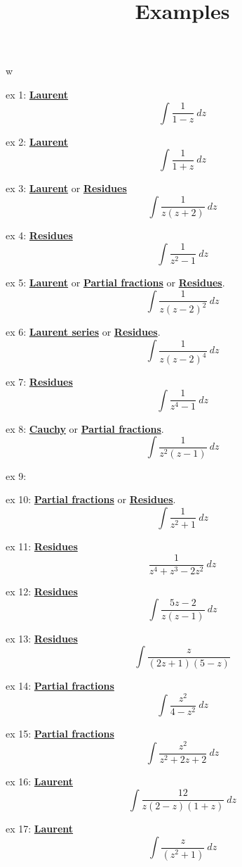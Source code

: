 w\documentclass[11pt, oneside]{article}
\title{Examples}
\date{}
\begin{document}
\maketitle
\large


ex 1:  \hyperref[sec:series_cheatsheet]{\textbf{Laurent}}
\[ \int \frac{1}{1 - z} \ dz \]

ex 2:  \hyperref[sec:series_cheatsheet]{\textbf{Laurent}}
\[ \int \frac{1}{1 + z} \ dz \]

ex 3:    \hyperref[sec:ex3L]{\textbf{Laurent}} or \hyperref[sec:ex3R]{\textbf{Residues}}
\[ \int \frac{1}{z(z + 2)} \ dz \]

ex 4:  \hyperref[sec:ex4R]{\textbf{Residues}} 
\[ \int \frac{1}{z^2 - 1} \ dz \]

ex 5:  \hyperref[sec:ex5L]{\textbf{Laurent}} or \hyperref[sec:ex5PF]{\textbf{Partial fractions}} or \hyperref[sec:ex5R]{\textbf{Residues}}.
\[ \int \frac{1}{z(z - 2)^2} \ dz \]

ex 6:  \hyperref[sec:ex6L]{\textbf{Laurent series}} or \hyperref[sec:ex6R]{\textbf{Residues}}.
\[ \int \frac{1}{z(z - 2)^4} \ dz \]

ex 7: \hyperref[sec:ex7R]{\textbf{Residues}} 
\[ \int \frac{1}{z^4 - 1} \ dz \]

ex 8:  \hyperref[sec:ex8C]{\textbf{Cauchy}} or \hyperref[sec:ex8PF]{\textbf{Partial fractions}}.
\[ \int \frac{1}{z^2(z - 1)} \ dz \]

ex 9:  

ex 10:  \hyperref[sec:ex10PF]{\textbf{Partial fractions}} or \hyperref[sec:ex10R]{\textbf{Residues}}.
\[ \int \frac{1}{z^2 + 1} \ dz \]

ex 11:  \hyperref[sec:ex11R]{\textbf{Residues}} 
\[ \frac{1}{z^4 + z^3 - 2z^2} \ dz \]

ex 12:  \hyperref[sec:ex12R]{\textbf{Residues}} 
\[ \int \frac{5z - 2}{z(z - 1)} \ dz \]

ex 13:   \hyperref[sec:ex13R]{\textbf{Residues}} 
\[ \int \frac{z}{(2z + 1)(5 - z)} \]

ex 14:  \hyperref[sec:ex14PF]{\textbf{Partial fractions}} 
\[ \int \frac{z^2}{4 - z^2} \ dz \]

ex 15:  \hyperref[sec:ex15PF]{\textbf{Partial fractions}} 
\[ \int \frac{z^2}{z^2 + 2z + 2} \ dz \]

ex 16:  \hyperref[sec:ex16L]{\textbf{Laurent}}
\[ \int \frac{12}{z(2 - z)(1 + z)} \ dz \]

ex 17:  \hyperref[sec:ex17L]{\textbf{Laurent}}
\[ \int \frac{z}{(z^2 + 1)} \ dz \]
\end{document}
